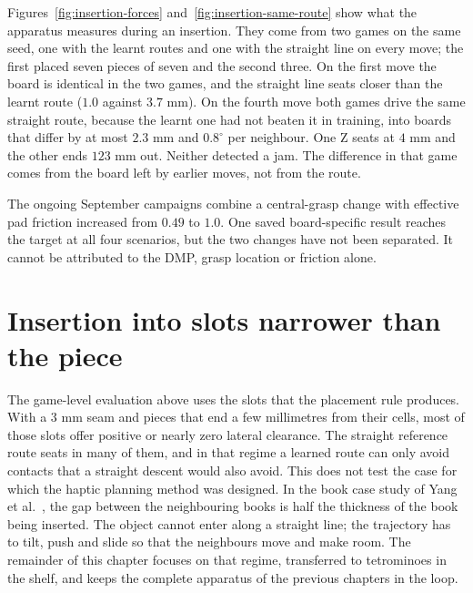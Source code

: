 Figures~\ref{fig:insertion-forces} and~\ref{fig:insertion-same-route} show what the apparatus measures during an insertion. They come from two games on the same seed, one with the learnt routes and one with the straight line on every move; the first placed seven pieces of seven and the second three. On the first move the board is identical in the two games, and the straight line seats closer than the learnt route ($1.0$ against $3.7$ mm). On the fourth move both games drive the same straight route, because the learnt one had not beaten it in training, into boards that differ by at most $2.3$ mm and $0.8^\circ$ per neighbour. One Z seats at $4$ mm and the other ends $123$ mm out. Neither detected a jam. The difference in that game comes from the board left by earlier moves, not from the route.



The ongoing September campaigns combine a central-grasp change with effective pad friction increased from $0.49$ to $1.0$. One saved board-specific result reaches the target at all four scenarios, but the two changes have not been separated. It cannot be attributed to the DMP, grasp location or friction alone.

\section{Insertion into slots narrower than the piece}
\label{sec:tight-slots}

The game-level evaluation above uses the slots that the placement rule produces. With a $3$ mm seam and pieces that end a few millimetres from their cells, most of those slots offer positive or nearly zero lateral clearance. The straight reference route seats in many of them, and in that regime a learned route can only avoid contacts that a straight descent would also avoid. This does not test the case for which the haptic planning method was designed. In the book case study of Yang et al.~\cite{yang2025haptic}, the gap between the neighbouring books is half the thickness of the book being inserted. The object cannot enter along a straight line; the trajectory has to tilt, push and slide so that the neighbours move and make room. The remainder of this chapter focuses on that regime, transferred to tetrominoes in the shelf, and keeps the complete apparatus of the previous chapters in the loop.

